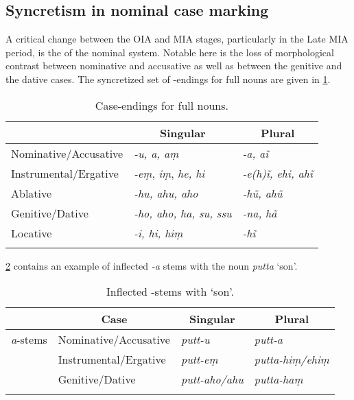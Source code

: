 \documentclass[output=paper,
modfonts
]{LSP/langsci}
\begin{document}
\subsection{Syncretism in nominal case marking}\label{case change}
A critical change between the OIA and MIA stages, particularly in the Late MIA period, 
is the  of the nominal  system. Notable here is the loss of
morphological contrast between nominative and accusative as well
as between the genitive and the dative cases. The syncretized
set of -endings for full nouns are  given in  \cref{mia-table}. 

\begin{table}
\begin{tabular}[t]{lll}
\lsptoprule
& \multicolumn{1}{c}{Singular} & \multicolumn{1}{c}{Plural} \\
\midrule
Nominative/Accusative & \textit{-u, a, aṃ} & \textit{-a, aĩ} \\
Instrumental/Ergative &\textit{-eṃ}, \textit{iṃ}, \textit{he, hi} & \textit{-e(h)ĩ, ehi, ahĩ} \\
Ablative & \textit{-hu, ahu, aho} & \textit{-hũ, ahũ} \\
Genitive/Dative & \textit{-ho, aho, ha, su, ssu} & \textit{-na, hã} \\
Locative & \textit{-i, hi, hiṃ} & \textit{-hĩ} \\
\lspbottomrule
\end{tabular}
\caption{Case-endings for full nouns.}
\label{mia-table}
\end{table} 


\cref{tab:putta} contains an example of inflected \textit{-a} stems with the noun \textit{putta} `son'. 
\begin{table}
\begin{tabular}[t]{llll}
\lsptoprule
\multicolumn{1}{c}{Stem} & \multicolumn{1}{c}{Case} & \multicolumn{1}{c}{Singular} & \multicolumn{1}{c}{Plural} \\
\midrule
\textit{a}-stems &  Nominative/Accusative  &  \textit{putt-u} & \textit{putt-a}   \\
 & Instrumental/Ergative & \textit{putt-eṃ} & \textit{putta-hiṃ/ehiṃ}  \\
 & Genitive/Dative & \textit{putt-aho/ahu}  & \textit{putta-haṃ}\\
 \lspbottomrule
\end{tabular} 
\caption{Inflected -stems with  `son'.}
\label{tab:putta}
\end{table}
 
\end{document}
